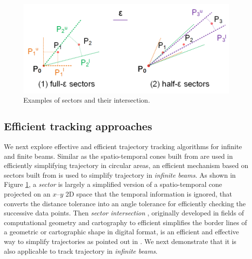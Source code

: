 \begin{figure}[tb!]
	\centering
	\includegraphics[scale=1.0]{figures/Fig-Sleeve.png}
	\vspace{-2ex}
	\caption{\small Examples of sectors and their intersection.}
	\vspace{-2ex}
	\label{fig:sleeve}
\end{figure}

\subsection{Efficient tracking approaches}
\label{sec:track_cone_sector}


We next explore effective and efficient trajectory tracking algorithms for infinite and finite beams.
%
Similar as the spatio-temporal cones built from \sed are used in efficiently simplifying trajectory in circular areas, an efficient mechanism based on sectors built from \ped is used to simplify trajectory in \emph{infinite beams}. As shown in Figure \ref{fig:sleeve}, a \emph{sector} is largely a simplified version of a spatio-temporal cone projected on an $x$--$y$ 2D space that the temporal information is ignored, that converts the \ped distance tolerance into an angle tolerance for efficiently checking the successive data points. 
Then \textit{sector intersection} \cite{Williams:Longest, Sklansky:Cone, Dunham:Cone, Zhao:Sleeve}, originally developed in fields of computational geometry and cartography to efficient simplifies the border lines of a geometric or cartographic shape in digital format, is an efficient and effective way to simplify trajectories as pointed out in \cite{Lin:Cised}.
We next demonstrate that it is also applicable to track trajectory in \emph{infinite beams}.


